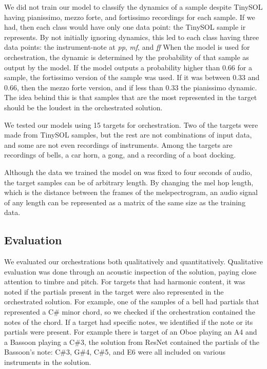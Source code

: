 \documentclass{article}
\begin{document}
We did not train our model to classify the dynamics of a sample despite TinySOL having pianissimo, mezzo forte, and fortissimo recordings for each sample. If we had, then each class would have only one data point: the TinySOL sample ir represents. By not initially ignoring dynamics, this led to each class having three data points: the instrument-note at \textit{pp}, \textit{mf}, and \textit{ff} When the model is used for orchestration, the dynamic is determined by the probability of that sample as output by the model. If the model outputs a probability higher than $0.66$ for a sample, the fortissimo version of the sample was used. If it was between $0.33$ and $0.66$, then the mezzo forte version, and if less than $0.33$ the pianissimo dynamic. The idea behind this is that samples that are the most represented in the target should be the loudest in the orchestrated solution.

We tested our models using 15 targets for orchestration. Two of the targets were made from TinySOL samples, but the rest are not combinations of input data, and some are not even recordings of instruments. Among the targets are recordings of bells, a car horn, a gong, and a recording of a boat docking. 

Although the data we trained the model on was fixed to four seconds of audio, the target samples can be of arbitrary length. By changing the mel hop length, which is the distance between the frames of the melspectrogram, an audio signal of any length can be represented as a matrix of the same size as the training data.

\subsection{Evaluation}

We evaluated our orchestrations both qualitatively and quantitatively. Qualitative evaluation was done through an acoustic inspection of the solution, paying close attention to timbre and pitch. For targets that had harmonic content, it was noted if the partials present in the target were also represented in the orchestrated solution. For example, one of the samples of a bell had partials that represented a C\# minor chord, so we checked if the orchestration contained the notes of the chord. If a target had specific notes, we identified if the note or its partials were present. For example there is target of an Oboe playing an A4 and a Bassoon playing a C\#3, the solution from ResNet contained the partials of the Bassoon's note: C\#3, G\#4, C\#5, and E6 were all included on various instruments in the solution.
\end{document}

